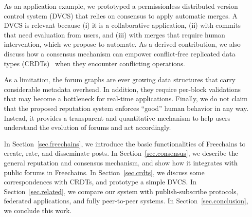 \documentclass[10pt,journal,compsoc]{IEEEtran}
\newcommand{\FC}       {Freechains\xspace}
\begin{document}
As an application example, we prototyped a permissionless distributed version
control system (DVCS) that relies on consensus to apply automatic merges.
A DVCS is relevant because
    (i)   it is a collaborative application,
    (ii)  with commits that need evaluation from users, and
    (iii) with merges that require human intervention, which we propose to
          automate.
%
As a derived contribution, we also discuss how a consensus mechanism can
empower conflict-free replicated data types (CRDTs)~\cite{p2p.merkle-crdts}
when they encounter conflicting operations.

As a limitation, the forum graphs are ever growing data structures that carry
considerable metadata overhead.
In addition, they require per-block validations that may become a bottleneck
for real-time applications.
%
Finally, we do not claim that the proposed reputation system enforces ``good''
human behavior in any way.
Instead, it provides a transparent and quantitative mechanism to help users
understand the evolution of forums and act accordingly.

In Section~\ref{sec.freechains}, we introduce the basic functionalities of \FC
to create, rate, and disseminate posts.
In Section~\ref{sec.consensus}, we describe the general reputation and
consensus mechanism, and show how it integrates with public forums in \FC.
In Section~\ref{sec.crdts}, we discuss some correspondences with
CRDTs, and prototype a simple DVCS.
In Section~\ref{sec.related}, we compare our system with publish-subscribe
protocols, federated applications, and fully peer-to-peer systems.
In Section~\ref{sec.conclusion}, we conclude this work.
\end{document}

